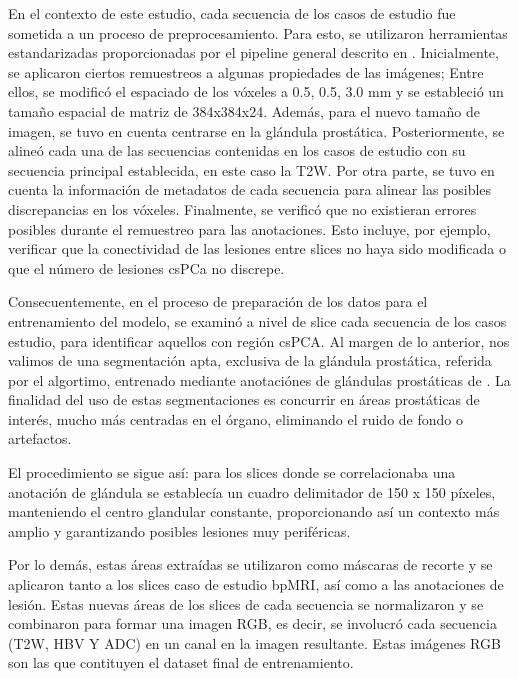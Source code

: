 En el contexto de este estudio, cada secuencia de los casos de estudio fue sometida a un proceso de preprocesamiento. Para esto, se utilizaron herramientas estandarizadas proporcionadas por el pipeline general descrito en \cite{PICAI_challenge}. Inicialmente, se aplicaron ciertos remuestreos a algunas propiedades de las imágenes; Entre ellos, se modificó el espaciado de los vóxeles a 0.5, 0.5, 3.0 mm y se estableció un tamaño espacial de matriz de 384x384x24. Además, para el nuevo tamaño de imagen, se tuvo en cuenta  centrarse en la glándula prostática. Posteriormente, se alineó cada una de las secuencias contenidas en los casos de estudio con su secuencia principal establecida, en este caso la T2W.  Por otra parte, se tuvo en cuenta la información de metadatos de cada secuencia para alinear las posibles discrepancias en los vóxeles. Finalmente, se verificó que no existieran errores posibles durante el remuestreo para las anotaciones. Esto incluye, por ejemplo, verificar que la conectividad de las lesiones entre slices no haya sido modificada o que el número de lesiones csPCa no discrepe.

Consecuentemente, en el proceso de preparación de los datos para el entrenamiento del modelo, se examinó a nivel de slice cada secuencia de los casos estudio, para identificar aquellos con región csPCA. Al margen de lo anterior, nos valimos de una segmentación apta, exclusiva de la glándula prostática, referida por el algortimo\cite{PICAI_challenge}, entrenado mediante anotaciónes de glándulas prostáticas de \cite{Prostatex_Annotations}. La finalidad del uso de estas segmentaciones es concurrir en áreas prostáticas de interés, mucho más centradas en el órgano, eliminando el ruido de fondo o artefactos.

El procedimiento se sigue así: para los slices donde se correlacionaba una anotación de glándula se establecía un cuadro delimitador de 150 x 150 píxeles, manteniendo el centro glandular constante, proporcionando así un contexto más amplio y garantizando posibles lesiones muy periféricas. 

Por lo demás, estas áreas extraídas se utilizaron como máscaras de recorte y se aplicaron tanto a los slices caso de estudio bpMRI, así como a las anotaciones de lesión. Estas nuevas áreas de los slices de cada secuencia se normalizaron y se combinaron para formar una imagen RGB, es decir, se involucró cada secuencia (T2W, HBV Y ADC) en un canal en la imagen resultante. Estas imágenes RGB son las que contituyen el dataset final de entrenamiento.

